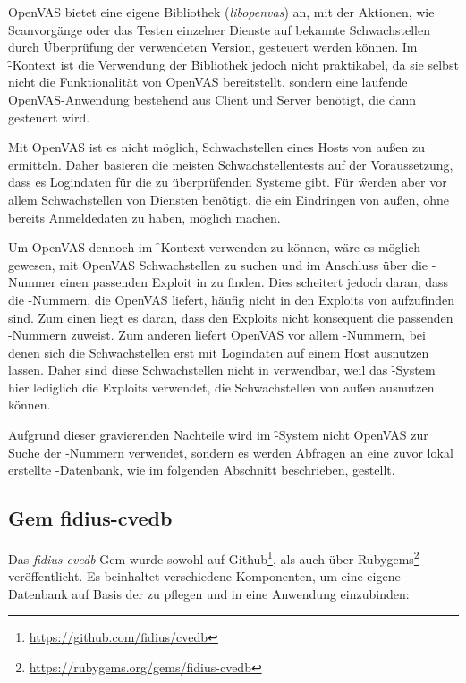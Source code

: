 OpenVAS bietet eine eigene Bibliothek (\textit{libopenvas}) an, mit der
Aktionen, wie Scanvorgänge oder das Testen einzelner Dienste auf
bekannte Schwachstellen durch Überprüfung der verwendeten Version,
gesteuert werden können. Im \f-Kontext ist die Verwendung der
Bibliothek jedoch nicht praktikabel, da sie selbst nicht die
Funktionalität von OpenVAS bereitstellt, sondern eine laufende
OpenVAS-Anwendung bestehend aus Client und Server benötigt, die dann
gesteuert wird.

Mit OpenVAS ist es nicht möglich, Schwachstellen eines Hosts von außen
zu ermitteln. Daher basieren die meisten Schwachstellentests auf der
Voraussetzung, dass es Logindaten für die zu überprüfenden Systeme
gibt. Für \f werden aber vor allem Schwachstellen von Diensten
benötigt, die ein Eindringen von außen, ohne bereits Anmeldedaten zu
haben, möglich machen.

Um OpenVAS dennoch im \f-Kontext verwenden zu können, wäre es möglich
gewesen, mit OpenVAS Schwachstellen zu suchen und im Anschluss über
die -Nummer einen passenden Exploit in  zu
finden. Dies scheitert jedoch daran, dass die -Nummern, die
OpenVAS liefert, häufig nicht in den Exploits von 
aufzufinden sind. Zum einen liegt es daran, dass  den
Exploits nicht konsequent die passenden -Nummern zuweist. Zum
anderen liefert OpenVAS vor allem -Nummern, bei denen sich
die Schwachstellen erst mit Logindaten auf einem Host ausnutzen
lassen. Daher sind diese Schwachstellen nicht in  verwendbar,
weil das \f-System hier lediglich die Exploits verwendet, die
Schwachstellen von außen ausnutzen können.

Aufgrund dieser gravierenden Nachteile wird im \f-System nicht
OpenVAS zur Suche der -Nummern verwendet, sondern es werden
Abfragen an eine zuvor lokal erstellte -Datenbank, wie im
folgenden Abschnitt beschrieben, gestellt.

\subsection{Gem fidius-cvedb}
\label{sec:gem-fidius-cvedb}

Das \textit{fidius-cvedb}-Gem wurde sowohl auf
Github\footnote{\url{https://github.com/fidius/cvedb}}, als auch über
Rubygems\footnote{\url{https://rubygems.org/gems/fidius-cvedb}}
veröffentlicht. Es beinhaltet verschiedene Komponenten, um eine eigene
-Datenbank auf Basis der  zu pflegen und in eine
 Anwendung einzubinden:

